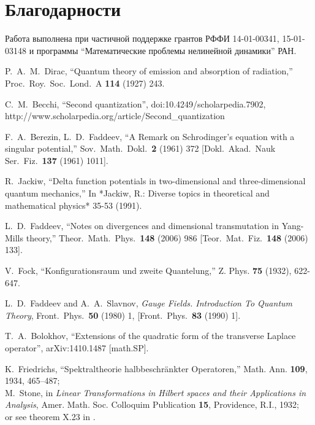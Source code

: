 \documentclass[12pt]{article}
\begin{document}
\section*{Благодарности}
    Работа выполнена при частичной поддержке грантов РФФИ 14-01-00341,
    15-01-03148 и программы ``Математические проблемы нелинейной динамики''
    РАН.

\begin{thebibliography}{0}

P.~A.~M.~Dirac,
``Quantum theory of emission and absorption of radiation,''
Proc.\ Roy.\ Soc.\ Lond.\ A {\bf 114} (1927) 243.

C.~M.~Becchi,
``Second quantization'', doi:10.4249/scholarpedia.7902,
http://www.scholarpedia.org/article/Second\_quantization

    F.~A.~Berezin, L.~D.~Faddeev,
  ``A Remark on Schrodinger's equation with a singular potential,''
  Sov.\ Math.\ Dokl.\  {\bf 2} (1961) 372
  [Dokl.\ Akad.\ Nauk Ser.\ Fiz.\  {\bf 137} (1961) 1011].

  R.~Jackiw,
  ``Delta function potentials in two-dimensional and three-dimensional
  quantum mechanics,''
  In *Jackiw, R.: Diverse topics in theoretical and mathematical physics*
  35-53 (1991).

L.~D.~Faddeev,
``Notes on divergences and dimensional transmutation in Yang-Mills theory,''
Theor.\ Math.\ Phys.\  {\bf 148} (2006) 986
[Teor.\ Mat.\ Fiz.\  {\bf 148} (2006) 133].

V.~Fock, ``Konfigurationsraum und zweite Quantelung,''
Z. Phys. {\bf 75} (1932), 622-647.

  L.~D.~Faddeev and A.~A.~Slavnov,
\emph{Gauge Fields. Introduction To Quantum Theory},
Front.\ Phys.\  {\bf 50} (1980) 1, [Front.\ Phys.\  {\bf 83} (1990) 1].

 T.~A.~Bolokhov,
``Extensions of the quadratic form of the transverse Laplace operator'',
arXiv:1410.1487 [math.SP].

    K.~Friedrichs, ``Spektraltheorie halbbeschr\"ankter Operatoren,''
    Math. Ann. {\bf 109}, 1934, 465--487;\\
    M.~Stone, in \emph{Linear Transformations in Hilbert spaces and their
    Applications in Analysis}, Amer. Math. Soc. Colloquim Publication {\bf 15},
    Providence, R.I., 1932;\\
    or see theorem X.23 in \cite{RS2}.


\end{thebibliography}
\end{document}
